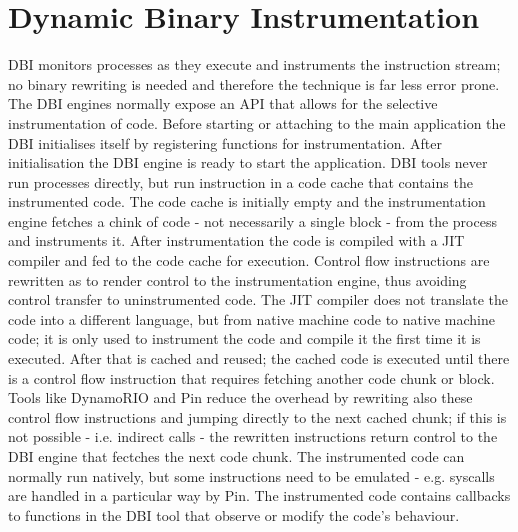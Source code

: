 \section{Dynamic Binary Instrumentation}
DBI monitors processes as they execute and instruments the instruction stream; no binary rewriting is needed and
therefore the technique is far less error prone. The DBI engines normally expose an API that allows for the selective
instrumentation of code. Before starting or attaching to the main application the DBI initialises itself by registering
functions for instrumentation. After initialisation the DBI engine is ready to start the application. DBI tools never
run processes directly, but run instruction in a code cache that contains the instrumented code. The code cache is
initially empty and the instrumentation engine fetches a chink of code - not necessarily a single block - from the
process and instruments it. After instrumentation the code is compiled with a JIT compiler and fed to the code cache for
execution. Control flow instructions are rewritten as to render control to the instrumentation engine, thus avoiding
control transfer to uninstrumented code. The JIT compiler does not translate the code into a different language, but
from native machine code to native machine code; it is only used to instrument the code and compile it the first time it
is executed. After that is cached and reused; the cached code is executed until there is a control flow instruction that
requires fetching another code chunk or block. Tools like DynamoRIO and Pin reduce the overhead by rewriting also these
control flow instructions and jumping directly to the next cached chunk; if this is not possible - i.e. indirect calls -
the rewritten instructions return control to the DBI engine that fectches the next code chunk. The instrumented code can
normally run natively, but some instructions need to be emulated - e.g. {\ttfamily syscalls} are handled in a particular
way by Pin. The instrumented code contains callbacks to functions in the DBI tool that observe or modify the code's
behaviour.
